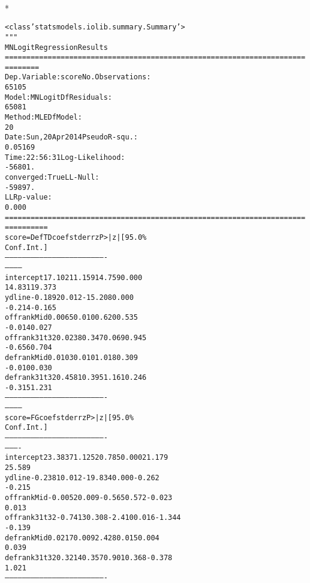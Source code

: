 \documentclass[letterpaper,10pt,english]{/anaconda/lib/python2.7/site-packages/sphinx/texinputs/sphinxhowto}
\def\smaller{\fontsize{9.5pt}{9.5pt}\selectfont}
\newenvironment{InvisibleVerbatim}
        {\begin{mdframed}[leftmargin=0.1\linewidth,innerleftmargin=3pt,innerrightmargin=3pt, userdefinedwidth=1\linewidth, linewidth=0pt, linecolor=white, usetwoside=false]}
        {\end{mdframed}}
\begin{document}
                \makebox[0.1\linewidth]{\smaller\hfill\tt\color{nbframe-out-prompt}Out\hspace{4pt}{[}13{]}:\hspace{4pt}}\\*
                \vspace{-2.55\baselineskip}\begin{InvisibleVerbatim}
                \vspace{-0.5\baselineskip}
\begin{alltt}<class 'statsmodels.iolib.summary.Summary'>
"""
                          MNLogit Regression Results
======================================================================
========
Dep. Variable:                  score   No. Observations:
65105
Model:                        MNLogit   Df Residuals:
65081
Method:                           MLE   Df Model:
20
Date:                Sun, 20 Apr 2014   Pseudo R-squ.:
0.05169
Time:                        22:56:31   Log-Likelihood:
-56801.
converged:                       True   LL-Null:
-59897.
                                        LLR p-value:
0.000
======================================================================
==========
   score=DefTD       coef    std err          z      P>|z|      [95.0\%
Conf. Int.]
----------------------------------------------------------------------
------------
intercept         17.1021      1.159     14.759      0.000
14.831    19.373
ydline            -0.1892      0.012    -15.208      0.000
-0.214    -0.165
offrankMid         0.0065      0.010      0.620      0.535
-0.014     0.027
offrank31t32       0.0238      0.347      0.069      0.945
-0.656     0.704
defrankMid         0.0103      0.010      1.018      0.309
-0.010     0.030
defrank31t32       0.4581      0.395      1.161      0.246
-0.315     1.231
----------------------------------------------------------------------
------------
    score=FG       coef    std err          z      P>|z|      [95.0\%
Conf. Int.]
----------------------------------------------------------------------
----------
intercept       23.3837      1.125     20.785      0.000        21.179
25.589
ydline          -0.2381      0.012    -19.834      0.000        -0.262
-0.215
offrankMid      -0.0052      0.009     -0.565      0.572        -0.023
0.013
offrank31t32    -0.7413      0.308     -2.410      0.016        -1.344
-0.139
defrankMid       0.0217      0.009      2.428      0.015         0.004
0.039
defrank31t32     0.3214      0.357      0.901      0.368        -0.378
1.021
----------------------------------------------------------------------

\end{alltt}
\end{InvisibleVerbatim}
\end{document}
